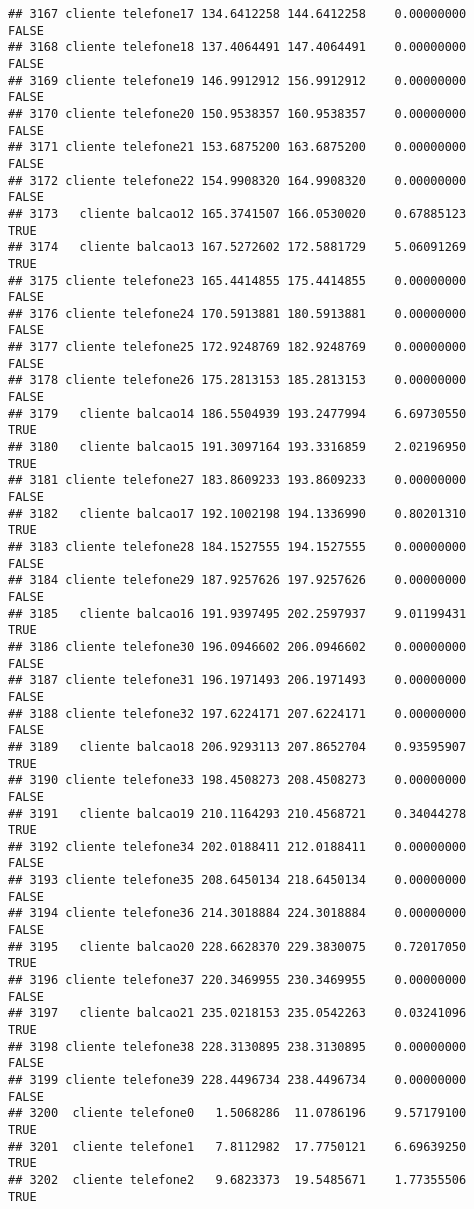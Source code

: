 \documentclass[
]{article}
\begin{document}
\begin{verbatim}
## 3167 cliente telefone17 134.6412258 144.6412258    0.00000000    FALSE
## 3168 cliente telefone18 137.4064491 147.4064491    0.00000000    FALSE
## 3169 cliente telefone19 146.9912912 156.9912912    0.00000000    FALSE
## 3170 cliente telefone20 150.9538357 160.9538357    0.00000000    FALSE
## 3171 cliente telefone21 153.6875200 163.6875200    0.00000000    FALSE
## 3172 cliente telefone22 154.9908320 164.9908320    0.00000000    FALSE
## 3173   cliente balcao12 165.3741507 166.0530020    0.67885123     TRUE
## 3174   cliente balcao13 167.5272602 172.5881729    5.06091269     TRUE
## 3175 cliente telefone23 165.4414855 175.4414855    0.00000000    FALSE
## 3176 cliente telefone24 170.5913881 180.5913881    0.00000000    FALSE
## 3177 cliente telefone25 172.9248769 182.9248769    0.00000000    FALSE
## 3178 cliente telefone26 175.2813153 185.2813153    0.00000000    FALSE
## 3179   cliente balcao14 186.5504939 193.2477994    6.69730550     TRUE
## 3180   cliente balcao15 191.3097164 193.3316859    2.02196950     TRUE
## 3181 cliente telefone27 183.8609233 193.8609233    0.00000000    FALSE
## 3182   cliente balcao17 192.1002198 194.1336990    0.80201310     TRUE
## 3183 cliente telefone28 184.1527555 194.1527555    0.00000000    FALSE
## 3184 cliente telefone29 187.9257626 197.9257626    0.00000000    FALSE
## 3185   cliente balcao16 191.9397495 202.2597937    9.01199431     TRUE
## 3186 cliente telefone30 196.0946602 206.0946602    0.00000000    FALSE
## 3187 cliente telefone31 196.1971493 206.1971493    0.00000000    FALSE
## 3188 cliente telefone32 197.6224171 207.6224171    0.00000000    FALSE
## 3189   cliente balcao18 206.9293113 207.8652704    0.93595907     TRUE
## 3190 cliente telefone33 198.4508273 208.4508273    0.00000000    FALSE
## 3191   cliente balcao19 210.1164293 210.4568721    0.34044278     TRUE
## 3192 cliente telefone34 202.0188411 212.0188411    0.00000000    FALSE
## 3193 cliente telefone35 208.6450134 218.6450134    0.00000000    FALSE
## 3194 cliente telefone36 214.3018884 224.3018884    0.00000000    FALSE
## 3195   cliente balcao20 228.6628370 229.3830075    0.72017050     TRUE
## 3196 cliente telefone37 220.3469955 230.3469955    0.00000000    FALSE
## 3197   cliente balcao21 235.0218153 235.0542263    0.03241096     TRUE
## 3198 cliente telefone38 228.3130895 238.3130895    0.00000000    FALSE
## 3199 cliente telefone39 228.4496734 238.4496734    0.00000000    FALSE
## 3200  cliente telefone0   1.5068286  11.0786196    9.57179100     TRUE
## 3201  cliente telefone1   7.8112982  17.7750121    6.69639250     TRUE
## 3202  cliente telefone2   9.6823373  19.5485671    1.77355506     TRUE

\end{verbatim}
\end{document}
